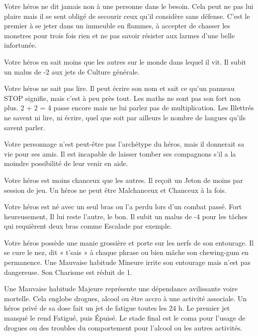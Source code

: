 \begin{description}[align=left]
    \item [Héroïque (Majeur)]
        Votre héros ne dit jamais non à une personne dans le besoin. Cela peut ne pas lui plaire mais il se sent obligé de secourir ceux qu'il considère sans défense. C'est le premier à se jeter dans un immeuble en flammes, à accepter de chasser les monstres pour trois fois rien et ne pas savoir résister aux larmes d'une belle infortunée.

    \item [Ignorant (Majeur)]
        Votre héros en sait moins que les autres sur le monde dans lequel il vit. Il subit un malus de -2 aux jets de Culture générale.

    \item [Illettré (Mineur)]
        Votre héros ne sait pas lire. Il peut écrire son nom et sait ce qu'un panneau STOP signifie, mais c'est à peu près tout. Les maths ne sont pas son fort non plus. 2 + 2 = 4 passe encore mais ne lui parlez pas de multiplication. Les Illettrés ne savent ni lire, ni écrire, quel que soit par ailleurs le nombre de langues qu'ils savent parler.

    \item [Loyal (Mineur)]
        Votre personnage n'est peut-être pas l'archétype du héros, mais il donnerait sa vie pour ses amis. Il est incapable de laisser tomber ses compagnons s'il a la moindre possibilité de leur venir en aide.

    \item [Malchanceux (Majeur)]
        Votre héros est moins chanceux que les autres. Il reçoit un Jeton de moins par session de jeu. Un héros ne peut être Malchanceux et Chanceux à la fois.

    \item [Manchot (Majeur)]
        Votre héros est né avec un seul bras ou l'a perdu lors d'un combat passé. Fort heureusement, Il lui reste l'autre, le bon. Il subit un malus de -4 pour les tâches qui requièrent deux bras comme Escalade par exemple.

    \item [Mauvaise habitude (Mineur ou Majeur)]
        Votre héros possède une manie grossière et porte sur les nerfs de son entourage. Il se cure le nez, dit « t'sais » à chaque phrase ou bien mâche son chewing-gum en permanence. Une Mauvaise habitude Mineure irrite son entourage mais n'est pas dangereuse. Son Charisme est réduit de 1.

        Une Mauvaise habitude Majeure représente une dépendance avilissante voire mortelle. Cela englobe drogues, alcool ou être accro à une activité associale. Un héros privé de sa dose fait un jet de fatigue toutes les 24 h. Le premier jet manqué le rend Fatigué, puis Épuisé. Le stade final est le coma pour l'usage de drogues ou des troubles du comportement pour l'alcool ou les autres activités.


\end{description}

